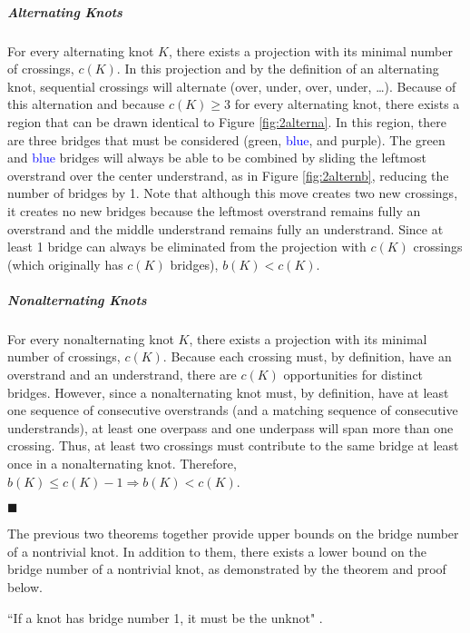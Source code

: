 \documentclass[titlepage]{article}
\newcommand{\dq}[4][]{``#2"#1 \cite[#4]{#3}.}
\newcommand{\qed}{
    \begin{flushright}
        $\blacksquare$
    \end{flushright}
}
\begin{document}
\subparagraph{\textbf{Alternating Knots}} For every alternating knot $K$, there exists a projection with its minimal number of crossings, $c(K)$. In this projection and by the definition of an alternating knot, sequential crossings will alternate (over, under, over, under, \dots). Because of this alternation and because $c(K)\geq 3$ for every alternating knot, there exists a region that can be drawn identical to Figure \ref{fig:2alterna}. In this region, there are three bridges that must be considered (\textcolor{grx}{green}, \textcolor{blue}{blue}, and \textcolor{pux}{purple}). The \textcolor{grx}{green} and \textcolor{blue}{blue} bridges will always be able to be combined by sliding the leftmost overstrand over the center understrand, as in Figure \ref{fig:2alternb}, reducing the number of bridges by 1. Note that although this move creates two new crossings, it creates no new bridges because the leftmost overstrand remains fully an overstrand and the middle understrand remains fully an understrand. Since at least 1 bridge can always be eliminated from the projection with $c(K)$ crossings (which originally has $c(K)$ bridges), $b(K)<c(K)$.
\subparagraph{\textbf{Nonalternating Knots}} For every nonalternating knot $K$, there exists a projection with its minimal number of crossings, $c(K)$. Because each crossing must, by definition, have an overstrand and an understrand, there are $c(K)$ opportunities for distinct bridges. However, since a nonalternating knot must, by definition, have at least one sequence of consecutive overstrands (and a matching sequence of consecutive understrands), at least one overpass and one underpass will span more than one crossing. Thus, at least two crossings must contribute to the same bridge at least once in a nonalternating knot. Therefore, $b(K)\leq c(K)-1\Rightarrow b(K)<c(K)$.
\qed

The previous two theorems together provide upper bounds on the bridge number of a nontrivial knot. In addition to them, there exists a lower bound on the bridge number of a nontrivial knot, as demonstrated by the theorem and proof below.

\begin{theor}
    \dq{If a knot has bridge number 1, it must be the unknot}{bib:knotbook}{65}
\end{theor}
\end{document}
